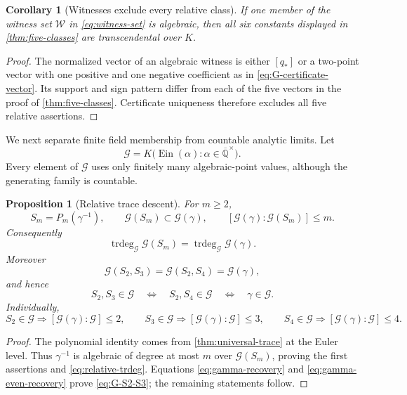 \documentclass[11pt]{article}
\newtheorem{proposition}[theorem]{Proposition}
\newtheorem{corollary}[theorem]{Corollary}
\theoremstyle{definition}
\theoremstyle{remark}
\newcommand{\Qbar}{\overline{\mathbb Q}}
\newcommand{\Ein}{\operatorname{Ein}}
\newcommand{\trdeg}{\operatorname{trdeg}}
\newcommand{\calG}{\mathcal G}
\begin{document}
\begin{corollary}[Witnesses exclude every relative class]
\label{cor:witness-all-K-trans}
If one member of the witness set \(\mathcal W\) in
\eqref{eq:witness-set} is algebraic, then all six constants displayed in
\cref{thm:five-classes} are transcendental over \(K\).
\end{corollary}

\begin{proof}
The normalized vector of an algebraic witness is either \([q_*]\) or a
two-point vector with one positive and one negative coefficient as in
\eqref{eq:G-certificate-vector}.  Its support and sign pattern differ from
each of the five vectors in the proof of \cref{thm:five-classes}.  Certificate
uniqueness therefore excludes all five relative assertions.
\end{proof}

We next separate finite field membership from countable analytic limits.
Let
\begin{equation}\label{eq:G-field}
 \calG=K\bigl(\Ein(\alpha):\alpha\in\Qbar^\times\bigr).
\end{equation}
Every element of \(\calG\) uses only finitely many algebraic-point values,
although the generating family is countable.

\begin{proposition}[Relative trace descent]
\label{prop:relative-trace-descent}
For \(m\ge2\),
\[
 S_m=P_m(\gamma^{-1}),\qquad
 \calG(S_m)\subset\calG(\gamma),\qquad
 [\calG(\gamma):\calG(S_m)]\le m.
\]
Consequently
\begin{equation}\label{eq:relative-trdeg}
 \trdeg_{\calG}\calG(S_m)=\trdeg_{\calG}\calG(\gamma).
\end{equation}
Moreover
\begin{equation}\label{eq:G-S2-S3}
 \boxed{\calG(S_2,S_3)=\calG(S_2,S_4)=\calG(\gamma)},
\end{equation}
and hence
\begin{equation}\label{eq:joint-gamma-free}
 S_2,S_3\in\calG
 \quad\Longleftrightarrow\quad
 S_2,S_4\in\calG
 \quad\Longleftrightarrow\quad
 \gamma\in\calG.
\end{equation}
Individually,
\[
 S_2\in\calG\Longrightarrow[\calG(\gamma):\calG]\le2,
 \qquad
 S_3\in\calG\Longrightarrow[\calG(\gamma):\calG]\le3,
 \qquad
 S_4\in\calG\Longrightarrow[\calG(\gamma):\calG]\le4.
\]
\end{proposition}

\begin{proof}
The polynomial identity comes from \cref{thm:universal-trace} at the Euler
level.  Thus \(\gamma^{-1}\) is algebraic of degree at most \(m\) over
\(\calG(S_m)\), proving the first assertions and
\eqref{eq:relative-trdeg}.  Equations \eqref{eq:gamma-recovery} and
\eqref{eq:gamma-even-recovery} prove \eqref{eq:G-S2-S3}; the remaining
statements follow.
\end{proof}
\end{document}
